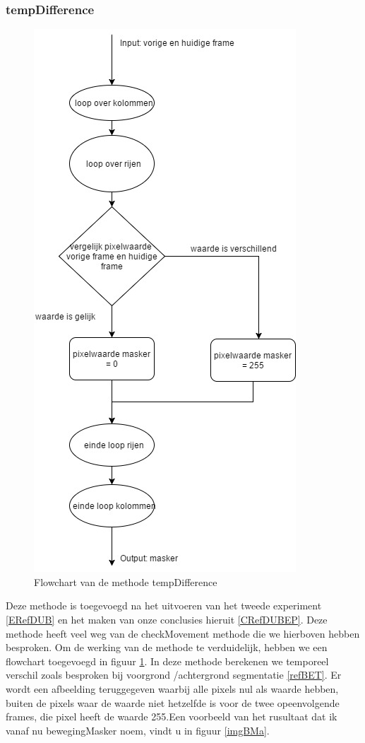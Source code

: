 \subsubsection{tempDifference}
\begin{figure}[h]
	\includegraphics[scale=0.45]{FlowChart_TempDifference}
	\caption{Flowchart van de methode tempDifference}
	\label{imgFCTDi}
\end{figure}
Deze methode is toegevoegd na het uitvoeren van het tweede experiment \ref{ERefDUB} en het maken van onze conclusies hieruit \ref{CRefDUBEP}. Deze methode heeft veel weg van de checkMovement methode die we hierboven hebben besproken. Om de werking van de methode te verduidelijk, hebben we een flowchart toegevoegd in figuur \ref{imgFCTDi}. In deze methode berekenen we temporeel verschil zoals besproken bij voorgrond /achtergrond segmentatie \ref{refBET}. Er wordt een afbeelding teruggegeven waarbij alle pixels nul als waarde hebben, buiten de pixels waar de waarde niet hetzelfde is voor de twee opeenvolgende frames, die pixel heeft de waarde 255.Een voorbeeld van het rusultaat dat ik vanaf nu bewegingMasker noem, vindt u in figuur \ref{imgBMa}. \\
